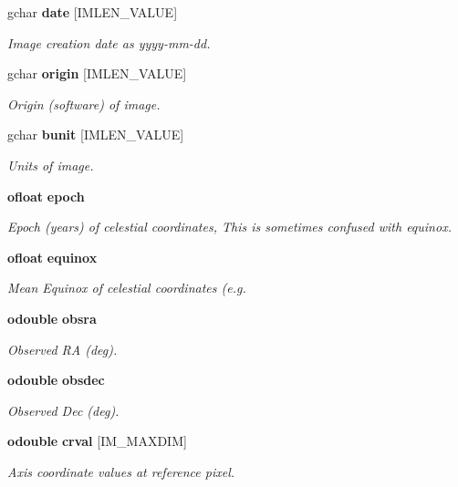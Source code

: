 \begin{CompactItemize}
gchar {\bf date} [IMLEN\_\-VALUE]
\begin{CompactList}\small\item\em Image creation date as yyyy-mm-dd. \item\end{CompactList}\item 
gchar {\bf origin} [IMLEN\_\-VALUE]
\begin{CompactList}\small\item\em Origin (software) of image. \item\end{CompactList}\item 
gchar {\bf bunit} [IMLEN\_\-VALUE]
\begin{CompactList}\small\item\em Units of image. \item\end{CompactList}\item 
{\bf ofloat} {\bf epoch}
\begin{CompactList}\small\item\em Epoch (years) of celestial coordinates, This is sometimes confused with equinox. \item\end{CompactList}\item 
{\bf ofloat} {\bf equinox}
\begin{CompactList}\small\item\em Mean Equinox of celestial coordinates (e.g. \item\end{CompactList}\item 
{\bf odouble} {\bf obsra}
\begin{CompactList}\small\item\em Observed RA (deg). \item\end{CompactList}\item 
{\bf odouble} {\bf obsdec}
\begin{CompactList}\small\item\em Observed Dec (deg). \item\end{CompactList}\item 
{\bf odouble} {\bf crval} [IM\_\-MAXDIM]
\begin{CompactList}\small\item\em Axis coordinate values at reference pixel. \item\end{CompactList}\item 

\end{CompactItemize}
